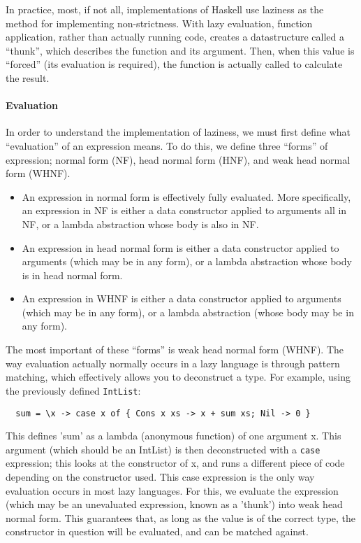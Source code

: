 \documentclass[9pt]{extarticle}
\begin{document}
In practice, most, if not all, implementations of Haskell use laziness
as the method for implementing non-strictness. With lazy evaluation,
function application, rather than actually running code, creates a
datastructure called a ``thunk'', which describes the function and its
argument. Then, when this value is ``forced'' (its evaluation is
required), the function is actually called to calculate the result.

\paragraph{Evaluation}

In order to understand the implementation of laziness, we must first define what
``evaluation'' of an expression means. To do this, we define three ``forms'' of
expression; normal form (NF), head normal form (HNF), and weak head normal form
(WHNF). 

\begin{itemize}

  \item An expression in normal form is effectively fully evaluated. More
  specifically, an expression in NF is either a data constructor applied to
  arguments all in NF, or a lambda abstraction whose body is also in NF.

  \item An expression in head normal form is either a data constructor applied to
  arguments (which may be in any form), or a lambda abstraction whose body is
  in head normal form. 

  \item An expression in WHNF is either a data constructor applied to arguments
  (which may be in any form), or a lambda abstraction (whose body may be in
  any form). 

\end{itemize}

The most important of these ``forms'' is weak head normal form (WHNF).
The way evaluation actually normally occurs in a lazy language is
through pattern matching, which effectively allows you to deconstruct a
type. For example, using the previously defined \verb'IntList': 

\begin{verbatim}
  sum = \x -> case x of { Cons x xs -> x + sum xs; Nil -> 0 } 
\end{verbatim}

This defines 'sum' as a lambda (anonymous function) of one argument x.
This argument (which should be an IntList) is then deconstructed with a
\verb'case' expression; this looks at the constructor of x, and runs a
different piece of code depending on the constructor used. This case
expression is the only way evaluation occurs in most lazy languages. For
this, we evaluate the expression (which may be an unevaluated
expression, known as a 'thunk') into weak head normal form. This
guarantees that, as long as the value is of the correct type, the
constructor in question will be evaluated, and can be matched against. 
\end{document}
